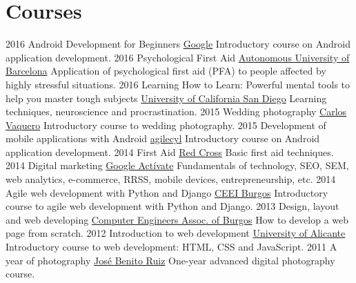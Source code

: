 \documentclass[]{friggeri-cv}
\begin{document}
\section{Courses}
\begin{entrylist}
  \entry
    {2016}
    {Android Development for Beginners}
    {\href{https://www.udacity.com/course/android-development-for-beginners--ud837}{Google}}
    {Introductory course on Android application development.}
  \entry
    {2016}
    {Psychological First Aid}
    {\href{https://www.coursera.org/learn/pap}{Autonomous University of Barcelona}}
    {Application of psychological first aid (PFA) to people affected by highly stressful situations.}
  \entry
    {2016}
    {Learning How to Learn: Powerful mental tools to help you master tough subjects}
    {\href{https://coursera.org/learn/learning-how-to-learn/}{University of California San Diego}}
    {Learning techniques, neuroscience and procrastination.}
  \entry
    {2015}
    {Wedding photography}
    {\href{http://www.carlosvaquero.es/}{Carlos Vaquero}}
    {Introductory course to wedding photography.}
  \entry
    {2015}
    {Development of mobile applications with Android}
    {\href{http://agilecyl.org/}{agilecyl}}
    {Introductory course on Android application development.}
  \entry
    {2014}
    {First Aid}
    {\href{http://www.cruzroja.es/}{Red Cross}}
    {Basic first aid techniques.}
  \entry
    {2014}
    {Digital marketing}
    {\href{https://www.google.es/landing/activate/}{Google Actívate}} 
    {Fundamentals of technology, SEO, SEM, web analytics, e-commerce, RRSS, mobile devices, entrepreneurship, etc.}
  \entry
    {2014}
    {Agile web development with Python and Django}
    {\href{http://www.ceeiburgos.es/}{CEEI Burgos}} 
    {Introductory course to agile web development with Python and Django.}    
  \entry
    {2013}
    {Design, layout and web developing}
    {\href{http://abi2burgos.es/}{Computer Engineers Assoc. of Burgos}}   
    {How to develop a web page from scratch.}     
  \entry
    {2012}
    {Introduction to web development}
    {\href{https://www.ua.es/}{University of Alicante}}  
    {Introductory course to web development: HTML, CSS and JavaScript.}     
  \entry
    {2011}
    {A year of photography}
    {\href{http://josebruiz.com/}{José Benito Ruiz}}    
    {One-year advanced digital photography course.}      
\end{entrylist}
\end{document}
